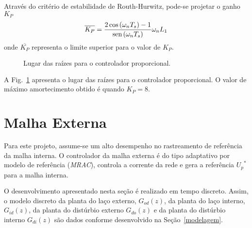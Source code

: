     Através do critério de estabilidade de Routh-Hurwitz, pode-se projetar o ganho $K_P$
    \begin{equation}
        \overline{K_P} = \frac{2 \cos \left( \omega_n T_s \right) - 1}
            {\operatorname{sen} \left( \omega_n T_s \right)} \omega_n L_1
    \end{equation}
    onde $\overline{K_P}$ representa o limite superior para o valor de $K_P$.

    \begin{figure}[htb]
        \centering{
            \def\svgwidth{\textwidth}
            }
        \renewcommand\figurename{Fig.}
        \caption{Lugar das raízes para o controlador proporcional.}
        \label{fig:rlocus_ic_2}
    \end{figure}

    A Fig.~\ref{fig:rlocus_ic_2} apresenta o lugar das raízes para o controlador proporcional. O valor de máximo amortecimento obtido é quando $K_P = 8$.


\section{Malha Externa}

    Para este projeto, assume-se um alto desempenho no rastreamento de referência da malha interna. O controlador da malha externa é do tipo adaptativo por modelo de referência (\emph{MRAC}), controla a corrente da rede e gera a referência ${U_p}^*$ para a malha interna.

    O desenvolvimento apresentado nesta seção é realizado em tempo discreto. Assim, o modelo discreto da planta do laço externo, $G_{od}(z)$, da planta do laço interno, $G_{id}(z)$, da planta do distúrbio externo $G_{do}(z)$ e da planta do distúrbio interno $G_{di}(z)$ são dados conforme desenvolvido na Seção~\ref{modelagem}.

